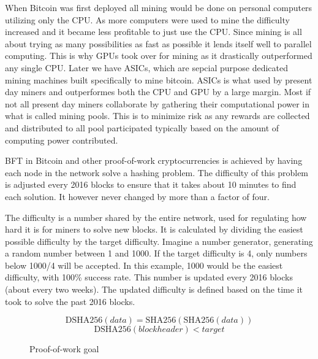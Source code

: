 \documentclass[12pt]{article}
\begin{document}
When Bitcoin was first deployed all mining would be done on personal computers utilizing only the CPU. As more computers were used to mine the difficulty increased and it became less profitable to just use the CPU. Since mining is all about trying as many possibilities as fast as possible it lends itself well to parallel computing. This is why GPUs took over for mining as it drastically outperformed any single CPU. Later we have ASICs, which are sepcial purpose dedicated mining machines built specifically to mine bitcoin. ASICs is what used by present day miners and outperformes both the CPU and GPU by a large margin. Most if not all present day miners collaborate by gathering their computational power in what is called mining pools. This is to minimize risk as any rewards are collected and distributed to all pool participated typically based on the amount of computing power contributed. 

BFT in Bitcoin and other proof-of-work cryptocurrencies is achieved by having each node in the network solve a hashing problem. The difficulty of this problem is adjusted every 2016 blocks to ensure that it takes about 10 minutes to find each solution. It however never changed by more than a factor of four\cite{tschorsch2015bitcoin}.

The difficulty is a number shared by the entire network, used for regulating how hard it is for miners to solve new blocks. It is calculated by dividing the easiest possible difficulty by the target difficulty. Imagine a number generator, generating a random number between 1 and 1000. If the target difficulty is 4, only numbers below 1000/4 will be accepted. In this example, 1000 would be the easiest difficulty, with 100\% success rate. This number is updated every 2016 blocks (about every two weeks). The updated difficulty is defined based on the time it took to solve the past 2016 blocks. 

\begin{figure}[h!]
\begin{equation*}
\textrm{DSHA256}(\mathit{data}) = \textrm{SHA256}(\textrm{SHA256}(\mathit{data}))
\end{equation*}
\begin{equation*}
\textrm{DSHA256}(\mathit{blockheader}) < \mathit{target}
\end{equation*}
\caption{Proof-of-work goal}
\end{figure}
\end{document}
